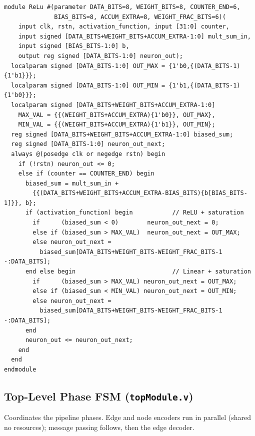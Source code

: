 \documentclass[10pt,a4paper]{article}
\begin{document}
\begin{lstlisting}
module ReLu #(parameter DATA_BITS=8, WEIGHT_BITS=8, COUNTER_END=6,
              BIAS_BITS=8, ACCUM_EXTRA=8, WEIGHT_FRAC_BITS=6)(
    input clk, rstn, activation_function, input [31:0] counter,
    input signed [DATA_BITS+WEIGHT_BITS+ACCUM_EXTRA-1:0] mult_sum_in,
    input signed [BIAS_BITS-1:0] b,
    output reg signed [DATA_BITS-1:0] neuron_out);
  localparam signed [DATA_BITS-1:0] OUT_MAX = {1'b0,{(DATA_BITS-1){1'b1}}};
  localparam signed [DATA_BITS-1:0] OUT_MIN = {1'b1,{(DATA_BITS-1){1'b0}}};
  localparam signed [DATA_BITS+WEIGHT_BITS+ACCUM_EXTRA-1:0]
    MAX_VAL = {{(WEIGHT_BITS+ACCUM_EXTRA){1'b0}}, OUT_MAX},
    MIN_VAL = {{(WEIGHT_BITS+ACCUM_EXTRA){1'b1}}, OUT_MIN};
  reg signed [DATA_BITS+WEIGHT_BITS+ACCUM_EXTRA-1:0] biased_sum;
  reg signed [DATA_BITS-1:0] neuron_out_next;
  always @(posedge clk or negedge rstn) begin
    if (!rstn) neuron_out <= 0;
    else if (counter == COUNTER_END) begin
      biased_sum = mult_sum_in +
        {{(DATA_BITS+WEIGHT_BITS+ACCUM_EXTRA-BIAS_BITS){b[BIAS_BITS-1]}}, b};
      if (activation_function) begin           // ReLU + saturation
        if      (biased_sum < 0)        neuron_out_next = 0;
        else if (biased_sum > MAX_VAL)  neuron_out_next = OUT_MAX;
        else neuron_out_next =
          biased_sum[DATA_BITS+WEIGHT_BITS-WEIGHT_FRAC_BITS-1 -:DATA_BITS];
      end else begin                           // Linear + saturation
        if      (biased_sum > MAX_VAL) neuron_out_next = OUT_MAX;
        else if (biased_sum < MIN_VAL) neuron_out_next = OUT_MIN;
        else neuron_out_next =
          biased_sum[DATA_BITS+WEIGHT_BITS-WEIGHT_FRAC_BITS-1 -:DATA_BITS];
      end
      neuron_out <= neuron_out_next;
    end
  end
endmodule
\end{lstlisting}

\subsection{Top-Level Phase FSM (\texttt{topModule.v})}
Coordinates the pipeline phases. Edge and node encoders run in parallel
(shared no resources); message passing follows, then the edge decoder.
\end{document}
